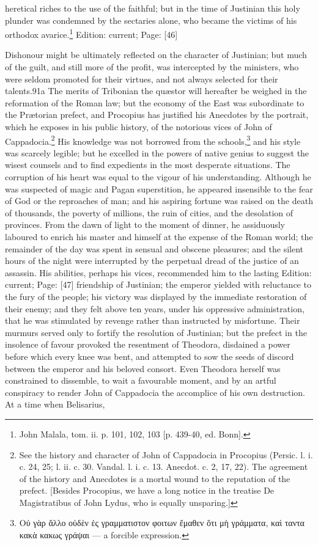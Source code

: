 heretical riches to the use of the faithful; but in the time of Justinian this holy plunder was condemned by the sectaries alone, who became the victims of his orthodox avarice.\footnote{John Malala, tom. ii. p. 101, 102, 103 [p. 439-40, ed. Bonn].}
Edition: current; Page: [46]

Dishonour might be ultimately reflected on the character of Justinian; but much of the guilt, and still more of the profit, was intercepted by the ministers, who were seldom promoted for their virtues, and not always selected for their talents.91a The merits of Tribonian the quæstor will hereafter be weighed in the reformation of the Roman law; but the economy of the East was subordinate to the Prætorian prefect, and Procopius has justified his Anecdotes by the portrait, which he exposes in his public history, of the notorious vices of John of Cappadocia.\footnote{See the history and character of John of Cappadocia in Procopius (Persic. l. i. c. 24, 25; l. ii. c. 30. Vandal. l. i. c. 13. Anecdot. c. 2, 17, 22). The agreement of the history and Anecdotes is a mortal wound to the reputation of the prefect. [Besides Procopius, we have a long notice in the treatise De Magistratibus of John Lydus, who is equally unsparing.]} His knowledge was not borrowed from the schools,\footnote{\textgreek{Ο\texthebrew{ὐ} γ\texthebrew{ὰ}ρ \texthebrew{ἄ}λλο ο\texthebrew{ὐ}δ\texthebrew{ὲ}ν \texthebrew{ἑ}ς γραμματιστον φοιτων \texthebrew{ἔ}μαθεν \texthebrew{ὅ}τι μ\texthebrew{ὴ} γράμματα, κα\texthebrew{ὶ} ταντα κακ\texthebrew{ὰ} κακως γράψαι} \texthebrew{—} a forcible expression.} and his style was scarcely legible; but he excelled in the powers of native genius to suggest the wisest counsels and to find expedients in the most desperate situations. The corruption of his heart was equal to the vigour of his understanding. Although he was suspected of magic and Pagan superstition, he appeared insensible to the fear of God or the reproaches of man; and his aspiring fortune was raised on the death of thousands, the poverty of millions, the ruin of cities, and the desolation of provinces. From the dawn of light to the moment of dinner, he assiduously laboured to enrich his master and himself at the expense of the Roman world; the remainder of the day was spent in sensual and obscene pleasures; and the silent hours of the night were interrupted by the perpetual dread of the justice of an assassin. His abilities, perhaps his vices, recommended him to the lasting Edition: current; Page: [47] friendship of Justinian; the emperor yielded with reluctance to the fury of the people; his victory was displayed by the immediate restoration of their enemy; and they felt above ten years, under his oppressive administration, that he was stimulated by revenge rather than instructed by misfortune. Their murmurs served only to fortify the resolution of Justinian; but the prefect in the insolence of favour provoked the resentment of Theodora, disdained a power before which every knee was bent, and attempted to sow the seeds of discord between the emperor and his beloved consort. Even Theodora herself was constrained to dissemble, to wait a favourable moment, and by an artful conspiracy to render John of Cappadocia the accomplice of his own destruction. At a time when Belisarius, 